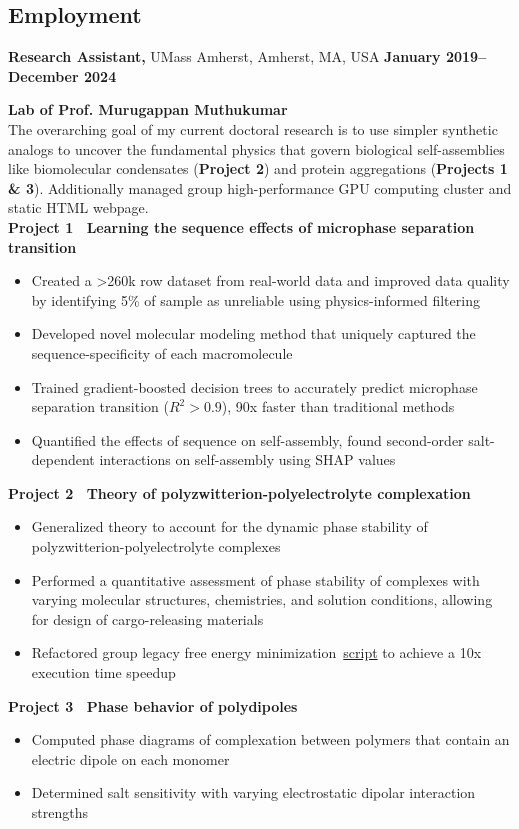 \documentclass[margin,line]{res}
\begin{document}
\begin{resume}
	\section{\sc Employment}
	 {\bf Research Assistant,} UMass Amherst, Amherst, MA, USA
	\hfill {\bf January 2019--December 2024}
	\begin{adjustwidth}{1.5em}{0pt}
		{\bf Lab of Prof. Murugappan Muthukumar}\\
		The overarching goal of my current doctoral research is to use simpler
		synthetic analogs to uncover the fundamental physics that govern biological
		self-assemblies like biomolecular condensates ({\bf Project 2}) and protein
		aggregations ({\bf Projects 1 \& 3}). Additionally managed group
		high-performance GPU computing cluster and static HTML webpage.
		\\
		{\bf Project 1~\textendash{} Learning the sequence effects of microphase
		separation transition}
		\begin{itemize}
			\item Created a >260k row dataset from real-world data and improved data
			      quality by identifying 5\% of sample as unreliable using
			      physics-informed filtering
			\item Developed novel molecular modeling method that uniquely captured
			      the sequence-specificity of each macromolecule
			\item Trained gradient-boosted decision trees to accurately predict
			      microphase separation transition ($R^{2} > 0.9$), 90x faster than
			      traditional methods
			\item Quantified the effects of sequence on self-assembly, found
			      second-order salt-dependent interactions on self-assembly using SHAP
			      values
		\end{itemize}
		{\bf Project 2~\textendash{} Theory of polyzwitterion-polyelectrolyte
		complexation}
		\begin{itemize}
			\item Generalized theory to account for the dynamic phase stability of
			      polyzwitterion-polyelectrolyte complexes
			\item Performed a quantitative assessment of phase stability of complexes
			      with varying molecular structures, chemistries, and solution
			      conditions, allowing for design of cargo-releasing materials
			\item Refactored group legacy free energy
			      minimization~\href{https://github.com/samuelhoover/free-energy-minimization}{script}
			      to achieve a 10x execution time speedup
		\end{itemize}
		{\bf Project 3~\textendash{} Phase behavior of polydipoles}
		\begin{itemize}
			\item Computed phase diagrams of complexation between polymers that
			      contain an electric dipole on each monomer
			\item Determined salt sensitivity with varying electrostatic dipolar
			      interaction strengths
		\end{itemize}
	\end{adjustwidth}


\end{resume}
\end{document}
